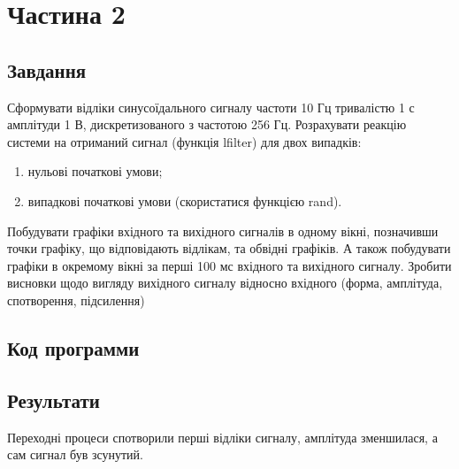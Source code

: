 \section{Частина 2}
\label{sec:task2}

\subsection{Завдання}
\label{subsec:task2_task}

Сформувати відліки синусоїдального сигналу частоти 10 Гц
тривалістю 1 с амплітуди 1 В, дискретизованого з частотою 256 Гц.
Розрахувати реакцію системи на отриманий сигнал (функція lfilter) для двох
випадків:
\begin{enumerate}
    \item нульові початкові умови;
    \item випадкові початкові умови (скористатися функцією rand).
\end{enumerate}
Побудувати графіки вхідного та вихідного
сигналів в одному вікні, позначивши точки графіку, що відповідають відлікам,
та обвідні графіків. А також побудувати графіки в окремому вікні за перші 100
мс вхідного та вихідного сигналу. Зробити висновки щодо вигляду
вихідного сигналу відносно вхідного (форма, амплітуда, спотворення,
підсилення)

\subsection{Код программи}
\label{subsec:task2_code}

\subsection{Результати}
\label{subsec:task2_results}

Переходні процеси спотворили перші відліки сигналу,
амплітуда зменшилася, а сам сигнал був зсунутий.
